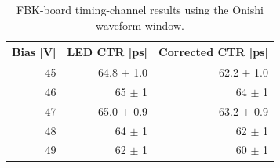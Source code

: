 \begin{table}[htbp]
\centering
\small
\begin{tabular}{rrr}
\toprule
Bias [V] & LED CTR [ps] & Corrected CTR [ps] \\
\midrule
45 & 64.8 $\pm$ 1.0 & 62.2 $\pm$ 1.0 \\
46 & 65 $\pm$ 1 & 64 $\pm$ 1 \\
47 & 65.0 $\pm$ 0.9 & 63.2 $\pm$ 0.9 \\
48 & 64 $\pm$ 1 & 62 $\pm$ 1 \\
49 & 62 $\pm$ 1 & 60 $\pm$ 1 \\
\bottomrule
\end{tabular}
\caption{FBK-board timing-channel results using the Onishi waveform window.}
\label{tab:fbk-timing-onishi}
\end{table}
